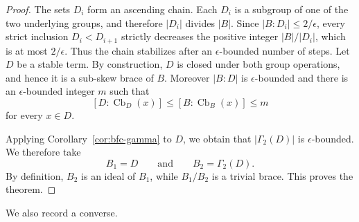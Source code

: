 \documentclass[10pt,a4paper]{amsart}
\numberwithin{equation}{section}
\newcommand{\Cb}{\operatorname{Cb} }
\begin{document}
\begin{proof}
The sets $D_i$ form an ascending chain. Each $D_i$ is a subgroup of one of the two underlying groups, and therefore $|D_i|$ divides $|B|$. Since $|B:D_i|\leqslant2/\epsilon$, every strict inclusion $D_i<D_{i+1}$ strictly decreases the positive integer $|B|/|D_i|$, which is at most $2/\epsilon$. Thus the chain stabilizes after an $\epsilon$-bounded number of steps. Let $D$ be a stable term. By construction, $D$ is closed under both group operations, and hence it is a sub-skew brace of $B$. Moreover $|B:D|$ is $\epsilon$-bounded and there is an $\epsilon$-bounded integer $m$ such that
$$
[D:\Cb_D(x)]\leqslant[B:\Cb_B(x)]\leqslant m
$$
for every $x\in D$.

Applying Corollary~\ref{cor:bfc-gamma} to $D$, we obtain that $|\Gamma_2(D)|$ is $\epsilon$-bounded. We therefore take
$$
B_1=D\qquad\text{and}\qquad B_2=\Gamma_2(D).
$$
By definition, $B_2$ is an ideal of $B_1$, while $B_1/B_2$ is a trivial brace. This proves the theorem.
\end{proof}


We also record a converse.
\end{document}
